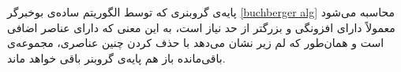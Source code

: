 %
پایه‌ی گروبنری که توسط الگوریتم ساده‌ی بوخبرگر
\ref{buchberger alg}
محاسبه می‌شود معمولاً دارای افزونگی و بزرگتر از حد نیاز است، به این معنی که دارای عناصر اضافی است و همان‌طور که لم زیر نشان می‌دهد با حذف کردن چنین عناصری، مجموعه‌‌ی باقی‌مانده باز هم پایه‌ی گروبنر باقی خواهد ماند.

